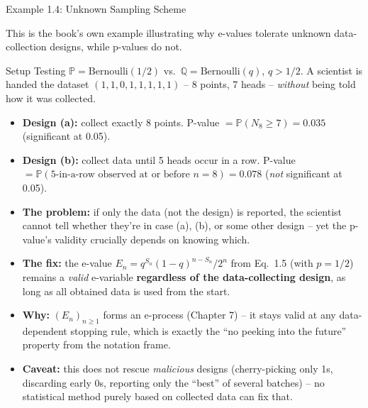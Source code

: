 \documentclass[aspectratio=169,10pt]{beamer}
\begin{document}
\begin{frame}[allowframebreaks]{Example 1.4: Unknown Sampling Scheme}

This is the book's own example illustrating why e-values tolerate unknown
data-collection designs, while p-values do not.

\begin{block}{Setup}
Testing $\mathbb{P}=\mathrm{Bernoulli}(1/2)$ vs.\ $\mathbb{Q}=\mathrm{Bernoulli}(q)$,
$q>1/2$. A scientist is handed the dataset $(1,1,0,1,1,1,1,1)$ -- 8 points,
7 heads -- \emph{without} being told how it was collected.
\begin{itemize}
  \item \textbf{Design (a):} collect exactly 8 points.
    P-value $= \mathbb{P}(N_8\ge 7) = 0.035$ (significant at 0.05).
  \item \textbf{Design (b):} collect data until 5 heads occur in a row.
    P-value $= \mathbb{P}(\text{5-in-a-row observed at or before } n=8) = 0.078$
    (\emph{not} significant at 0.05).
\end{itemize}
\end{block}

\framebreak

\begin{itemize}
  \item \textbf{The problem:} if only the data (not the design) is
    reported, the scientist cannot tell whether they're in case (a), (b),
    or some other design -- yet the p-value's validity crucially depends
    on knowing which.
  \item \textbf{The fix:} the e-value
    $E_n = q^{S_n}(1-q)^{n-S_n}/2^n$ from Eq.\ 1.5 (with $p=1/2$) remains a
    \emph{valid} e-variable \textbf{regardless of the data-collecting
    design}, as long as all obtained data is used from the start.
  \item \textbf{Why:} $(E_n)_{n\ge1}$ forms an e-process (Chapter 7) -- it
    stays valid at any data-dependent stopping rule, which is exactly the
    ``no peeking into the future'' property from the notation frame.
  \item \textbf{Caveat:} this does not rescue \emph{malicious} designs
    (cherry-picking only 1s, discarding early 0s, reporting only the ``best''
    of several batches) -- no statistical method purely based on collected
    data can fix that.
\end{itemize}

\end{frame}
\end{document}
